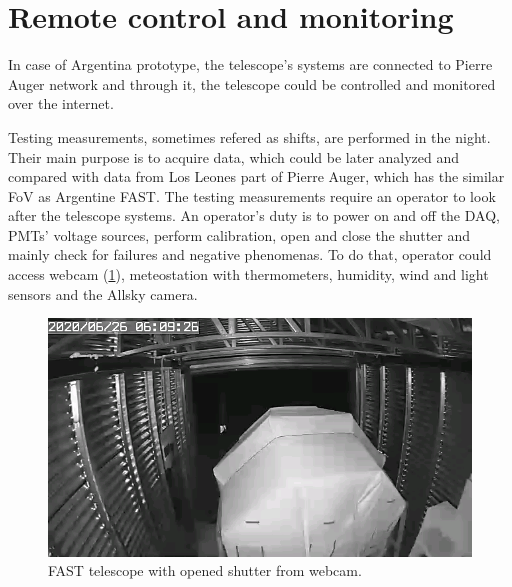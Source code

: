 \section{Remote control and monitoring}
In case of Argentina prototype, the telescope's systems are connected to Pierre Auger network and through it, the telescope could be controlled and monitored over the internet. 

\par
Testing measurements, sometimes refered as shifts, are performed in the night. Their main purpose is to acquire data, which could be later analyzed and compared with data from Los Leones part of Pierre Auger, which has the similar FoV as Argentine FAST. 
The testing measurements require an operator to look after the telescope systems. An operator's duty is to power on and off the DAQ, PMTs' voltage sources, perform calibration, open and close the shutter and mainly check for failures and negative phenomenas. To do that, operator could access webcam (\ref{FASTCam}), meteostation with thermometers, humidity, wind and light sensors and the Allsky camera.

\begin{figure}[H]
 \centering
 \includegraphics[scale = 0.5]{./pictures/operatinFast}
 \caption{FAST telescope with opened shutter from webcam.}
 \label{FASTCam}
 
\end{figure}

 







